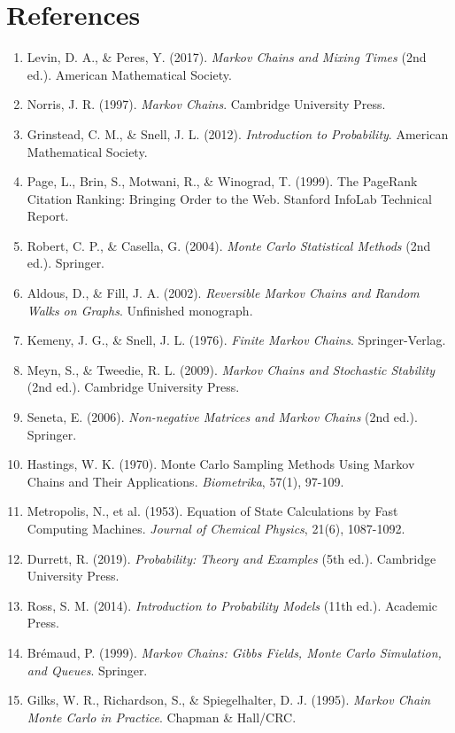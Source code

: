 \documentclass[11pt,a4paper]{article}
\begin{document}
\section*{References}

\begin{enumerate}
\item Levin, D. A., \& Peres, Y. (2017). \textit{Markov Chains and Mixing Times} (2nd ed.). American Mathematical Society.
\item Norris, J. R. (1997). \textit{Markov Chains}. Cambridge University Press.
\item Grinstead, C. M., \& Snell, J. L. (2012). \textit{Introduction to Probability}. American Mathematical Society.
\item Page, L., Brin, S., Motwani, R., \& Winograd, T. (1999). The PageRank Citation Ranking: Bringing Order to the Web. Stanford InfoLab Technical Report.
\item Robert, C. P., \& Casella, G. (2004). \textit{Monte Carlo Statistical Methods} (2nd ed.). Springer.
\item Aldous, D., \& Fill, J. A. (2002). \textit{Reversible Markov Chains and Random Walks on Graphs}. Unfinished monograph.
\item Kemeny, J. G., \& Snell, J. L. (1976). \textit{Finite Markov Chains}. Springer-Verlag.
\item Meyn, S., \& Tweedie, R. L. (2009). \textit{Markov Chains and Stochastic Stability} (2nd ed.). Cambridge University Press.
\item Seneta, E. (2006). \textit{Non-negative Matrices and Markov Chains} (2nd ed.). Springer.
\item Hastings, W. K. (1970). Monte Carlo Sampling Methods Using Markov Chains and Their Applications. \textit{Biometrika}, 57(1), 97-109.
\item Metropolis, N., et al. (1953). Equation of State Calculations by Fast Computing Machines. \textit{Journal of Chemical Physics}, 21(6), 1087-1092.
\item Durrett, R. (2019). \textit{Probability: Theory and Examples} (5th ed.). Cambridge University Press.
\item Ross, S. M. (2014). \textit{Introduction to Probability Models} (11th ed.). Academic Press.
\item Brémaud, P. (1999). \textit{Markov Chains: Gibbs Fields, Monte Carlo Simulation, and Queues}. Springer.
\item Gilks, W. R., Richardson, S., \& Spiegelhalter, D. J. (1995). \textit{Markov Chain Monte Carlo in Practice}. Chapman \& Hall/CRC.
\end{enumerate}
\end{document}
